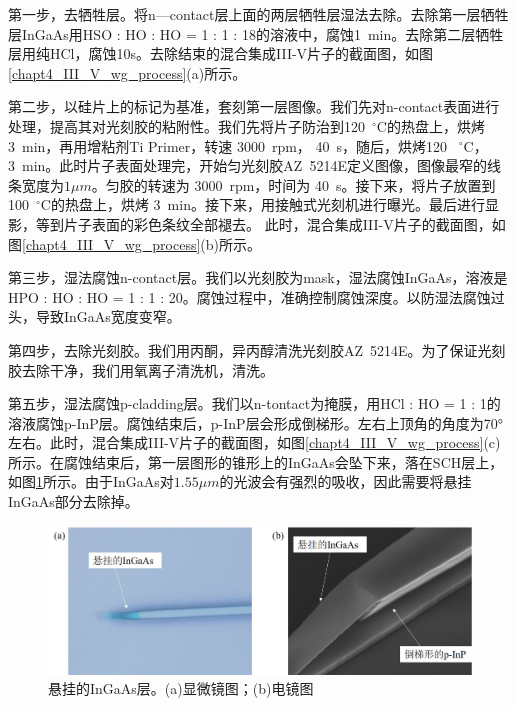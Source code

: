 第一步，去牺牲层。将n—contact层上面的两层牺牲层湿法去除。去除第一层牺牲层InGaAs用HSO : HO : HO = 1 : 1 : 18的溶液中，腐蚀1~min。去除第二层牺牲层用纯HCl，腐蚀10s。去除结束的混合集成III-V片子的截面图，如图\ref{chapt4_III_V_wg_process}(a)所示。

第二步，以硅片上的标记为基准，套刻第一层图像。我们先对n-contact表面进行处理，提高其对光刻胶的粘附性。我们先将片子防治到120~$^{\circ}$C的热盘上，烘烤3~min，再用增粘剂Ti Primer，转速 3000~rpm， 40~s，随后，烘烤120 ~$^{\circ}$C， 3~min。此时片子表面处理完，开始匀光刻胶AZ~5214E定义图像，图像最窄的线条宽度为$1 \mu m$。匀胶的转速为 3000~rpm，时间为 40~s。接下来，将片子放置到100~$^{\circ}$C的热盘上，烘烤 3~min。接下来，用接触式光刻机进行曝光。最后进行显影，等到片子表面的彩色条纹全部褪去。 此时，混合集成III-V片子的截面图，如图\ref{chapt4_III_V_wg_process}(b)所示。

第三步，湿法腐蚀n-contact层。我们以光刻胶为mask，湿法腐蚀InGaAs，溶液是HPO : HO : HO = 1 : 1 : 20。腐蚀过程中，准确控制腐蚀深度。以防湿法腐蚀过头，导致InGaAs宽度变窄。

第四步，去除光刻胶。我们用丙酮，异丙醇清洗光刻胶AZ~5214E。为了保证光刻胶去除干净，我们用氧离子清洗机，清洗。

第五步，湿法腐蚀p-cladding层。我们以n-tontact为掩膜，用HCl : HO = 1 : 1的溶液腐蚀p-InP层。腐蚀结束后，p-InP层会形成倒梯形。左右上顶角的角度为70°左右。此时，混合集成III-V片子的截面图，如图\ref{chapt4_III_V_wg_process}(c)所示。在腐蚀结束后，第一层图形的锥形上的InGaAs会坠下来，落在SCH层上，如图\ref{chapt4_III_V_suspeneded_InGaAs}所示。由于InGaAs对$1.55 \mu m$的光波会有强烈的吸收，因此需要将悬挂InGaAs部分去除掉。
\begin{figure}[!h]
	\centering
	\includegraphics[width=14cm]{./Pictures/chapt4_III_V_suspeneded_InGaAs.jpg}
	\caption{悬挂的InGaAs层。(a)显微镜图；(b)电镜图}
	\label{chapt4_III_V_suspeneded_InGaAs}
\end{figure}

